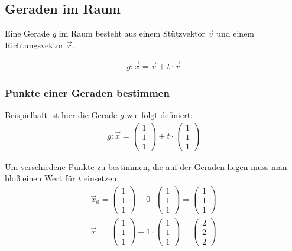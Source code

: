 \subsection{Geraden im Raum}
\begin{flushleft}
Eine Gerade $g$ im Raum besteht aus einem Stützvektor $\vec{v}$ und einem Richtungsvektor $\vec{r}$.

\begin{align}
    g\colon\vec{x}=\vec{v}+t\cdot\vec{r}
\end{align}
\end{flushleft}

\subsubsection{Punkte einer Geraden bestimmen}
\begin{flushleft}
Beispielhaft ist hier die Gerade $g$ wie folgt definiert:
\begin{align}
    g\colon\vec{x}=\begin{pmatrix} 1 \\ 1 \\ 1 \end{pmatrix}+t\cdot\begin{pmatrix} 1 \\ 1 \\ 1 \end{pmatrix}
\end{align}

Um verschiedene Punkte zu bestimmen, die auf der Geraden liegen muss man bloß einen Wert für $t$ einsetzen:
\begin{align}
    \vec{x}_0=\begin{pmatrix} 1 \\ 1 \\ 1 \end{pmatrix}+0\cdot\begin{pmatrix} 1 \\ 1 \\ 1 \end{pmatrix}=\begin{pmatrix} 1 \\ 1 \\ 1 \end{pmatrix} \\
    \vec{x}_1=\begin{pmatrix} 1 \\ 1 \\ 1 \end{pmatrix}+1\cdot\begin{pmatrix} 1 \\ 1 \\ 1 \end{pmatrix}=\begin{pmatrix} 2 \\ 2 \\ 2 \end{pmatrix}
\end{align}
\end{flushleft}

